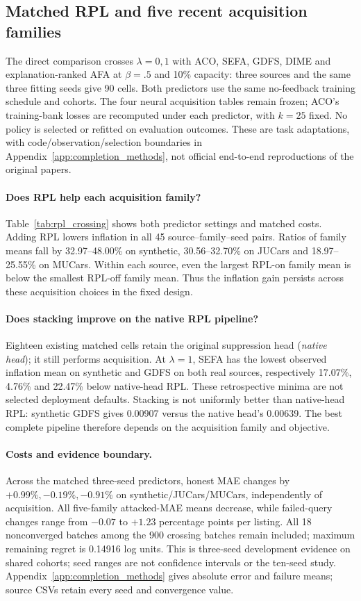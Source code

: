 \documentclass[11pt]{article}
\begin{document}
\subsection{Matched RPL and five recent acquisition families}\label{sec:recent_results}
The direct comparison crosses $\lambda=0,1$ with ACO, SEFA, GDFS, DIME
and explanation-ranked AFA at $\beta=.5$ and 10\% capacity: three sources
and the same three fitting seeds give 90 cells. Both predictors use the
same no-feedback training schedule and cohorts. The four neural acquisition
tables remain frozen; ACO's training-bank losses are recomputed under each
predictor, with $k=25$ fixed. No policy is selected or refitted on evaluation
outcomes. These are task adaptations, with code/observation/selection
boundaries in Appendix~\ref{app:completion_methods}, not official end-to-end
reproductions of the original papers.

\paragraph{Does RPL help each acquisition family?}
Table~\ref{tab:rpl_crossing} shows both predictor settings and matched costs.
Adding RPL lowers inflation in all 45 source--family--seed pairs. Ratios of
family means fall by 32.97--48.00\% on synthetic, 30.56--32.70\% on JUCars
and 18.97--25.55\% on MUCars. Within each source, even the largest
RPL-on family mean is below the smallest RPL-off family mean. Thus the
inflation gain persists across these acquisition choices in the fixed design.

\paragraph{Does stacking improve on the native RPL pipeline?}
Eighteen existing matched cells retain the original suppression head
(\emph{native head}); it still performs acquisition. At $\lambda=1$,
SEFA has the lowest observed inflation mean on synthetic and GDFS on both
real sources, respectively 17.07\%, 4.76\% and 22.47\% below native-head
RPL. These retrospective minima are not selected deployment defaults.
Stacking is not uniformly better than native-head RPL: synthetic GDFS
gives 0.00907 versus the native head's 0.00639. The best complete pipeline
therefore depends on the acquisition family and objective.

\paragraph{Costs and evidence boundary.}
Across the matched three-seed predictors, honest MAE changes by
$+0.99\%,-0.19\%,-0.91\%$ on synthetic/JUCars/MUCars, independently of
acquisition. All five-family attacked-MAE means decrease, while failed-query
changes range from $-0.07$ to $+1.23$ percentage points per listing.
All 18 nonconverged batches among the 900 crossing batches remain included;
maximum remaining regret is 0.14916 log units. This is three-seed development
evidence on shared cohorts; seed ranges are not confidence intervals or the
ten-seed study. Appendix~\ref{app:completion_methods} gives absolute error
and failure means; source CSVs retain every seed and convergence value.
\end{document}
